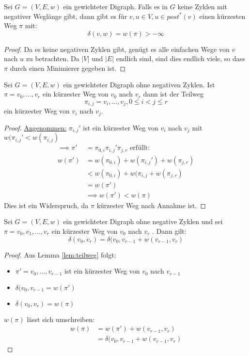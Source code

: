 \begin{lemma}
	Sei $G=(V,E,w)$  ein gewichteter Digraph. Falls es in $G$ keine Zyklen mit negativer Weglänge gibt, dann gibt es für $v,u \in V, u \in  post^{*}(v)$ einen kürzesten Weg $\pi$ mit:
	\[
	\delta(v,w) = w(\pi) > -\infty
	\]
\end{lemma}
\begin{proof}
Da es keine negativen Zyklen gibt, genügt es alle einfachen Wege von $v$ nach $u$ zu betrachten. Da $|V|$ und $|E|$ endlich sind, sind dies endlich viele, so dass $\pi$ durch einen Minimierer gegeben ist.
\end{proof}

\begin{lemma}
	\label{lem:teilweg}
	Sei $G=(V,E,w)$ ein gewichteter Digraph ohne negativen Zyklen. Ist $\pi= v_0, \ldots, v_r$ ein kürzester Weg von $v_0$  nach $v_r$ dann ist der Teilweg
	\[
		\pi_{i,j} =v_i,\ldots,v_j, 0\le i  <j \le r
	\]
ein kürzester Weg von $v_i$ nach $v_j$.
\end{lemma}
\begin{proof}
\underline{Angenommen:} $\pi_{i,j}'$ ist ein kürzester Weg von $v_i$ nach $v_j$ mit $w(\pi_{i,j}'  < w (\pi_{i,j})$
\begin{align*}
	\implies \pi' &= \pi_{0,i} \pi_{i,j}' \pi_{j,r} \text{ erfüllt:}\\
	w(\pi')&= w(\pi_{0,i})+w(\pi_{i,j}')+w(\pi_{j,r}) \\
	       &< w(\pi_{0,i})+ w(\pi_{i,j} + w(\pi_{j,r})\\
	       &= w(\pi') \\
	       &\implies w(\pi') < w(\pi)
\end{align*}
Dies ist ein Widerspruch, da $\pi$ kürzester Weg nach Annahme ist.
\end{proof}
\begin{lemma}
	Sei $G=(V,E,w)$ ein gewichteter Digraph ohne negative Zyklen und sei $\pi=v_0,v_1,\ldots,v_r$ ein kürzester Weg von $v_0$ nach $v_r$ . Dann gilt:
	\[
	\delta(v_0,v_r)= \delta(v_0, v_{r-1} + w(v_{r-1}, v_r)
	\]
\end{lemma}
\begin{proof}
Aus Lemma \ref{lem:teilweg} folgt:
\begin{itemize}
	\item $\pi' = v_0,\ldots, v_{r-1}$ ist ein kürzester Weg von $v_0$ nach $v_{r-1}$
	\item $\delta(v_0,v_{r-1} = w(\pi')$
	\item $\delta(v_0,v_r)= w(\pi)$	
\end{itemize}
$w(\pi)$ lässt sich umschreiben:
\begin{align*}
	w(\pi)&= w(\pi')+w(v_{r-1},v_r) \\
	      &= \delta(v_0,v_{r-1} + w(v_{r-1},v_r)
\end{align*}
\end{proof}

